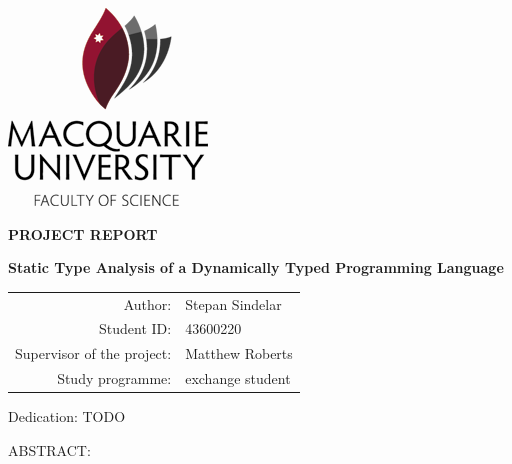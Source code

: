 \documentclass[12pt,a4paper]{report}
\begin{document}
\newcommand{\wthesis}[0]{report}
\newcommand{\wThesis}[0]{Report}

\newcommand{\wchapter}[0]{section}
\newcommand{\wChapter}[0]{Section}

\newcommand{\wsection}[0]{paragraph}
\newcommand{\wSection}[0]{Paragraph}



\pagestyle{empty}
\begin{center}

\vfill

\centerline{\mbox{\includegraphics{img/mq-logo.png}}}

\vspace{2cm}

{\bf\Large PROJECT REPORT}

\vfill

{\LARGE\bfseries Static Type Analysis of a Dynamically Typed
Programming Language}

\vfill

\begin{tabular}{rl}
Author: & Stepan Sindelar \\
\noalign{\vspace{2mm}}
Student ID: & 43600220 \\
\noalign{\vspace{2mm}}
Supervisor of the project: &  Matthew Roberts \\
\noalign{\vspace{2mm}}
Study programme: & exchange student \\
\end{tabular}

\vfill

\end{center}

\newpage
\noindent
Dedication: TODO

\newpage
\vspace{3cm}
\begin{center}
ABSTRACT:
\end{center}
\end{document}
